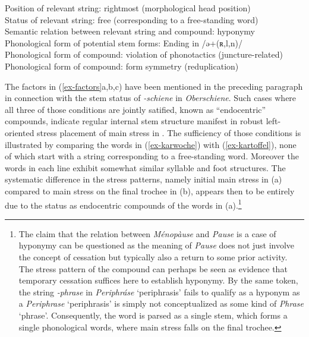 \documentclass[output=paper
 ,nobabel
 ,draftmode
 ,colorlinks, citecolor=brown
]{langscibook}
\begin{document}
\eal\label{ex-factors}

\ex\label{ex-rightmost} 
Position of relevant string: rightmost (morphological head position)\\
     
\ex\label{ex-hyponymy}
Status of relevant string: free (corresponding to a free-standing word)\\
  
\ex\label{ex-free-bound}  
Semantic relation between relevant string and compound: hyponymy\\

\ex\label{ex-stem-end}
Phonological form of potential stem forms: Ending in /ə+({ʀ,l,n})/ \\

\ex\label{ex-phon-viol}
Phonological form of compound: violation of phonotactics (juncture-related) \\
 
\ex\label{ex-phon-rep}
Phonological form of compound: form symmetry (reduplication) \\
    
\zl

\noindent
The factors in (\ref{ex-factors}a,b,c) have been
mentioned in the preceding paragraph in connection with the stem status of \emph{-schiene} in {\it
  Oberschiene}. Such cases where all three of those conditions are jointly satified, known as
``endocentric'' compounds, indicate regular internal stem structure manifest in robust left\hyp
oriented stress placement of main stress in . The sufficiency of
those conditions is illustrated by comparing the words in (\ref{ex-karwoche}) with
(\ref{ex-kartoffel}), none of which start with a string corresponding to a free-standing
word. Moreover the words in each line exhibit somewhat similar syllable and foot structures. The
systematic difference in the stress patterns, namely initial main stress in (a) compared to
main stress on the final trochee in (b), appears then to be entirely due to the status as
endocentric compounds of the words in (a).\footnote{The claim that the relation between
  \emph{Ménopàuse} and \emph{Pause} is a case of hyponymy can be questioned as the meaning of
  \emph{Pause} does not just involve the concept of cessation but typically also a return to some
  prior activity. The stress pattern of the compound can perhaps be seen as evidence that temporary
  cessation suffices here to establish hyponymy. By the same token, the string \emph{-phrase} in
  \emph{Periphráse} `periphrasis' fails to qualify as a hyponym as a \emph{Periphrase} `periphrasis'
  is simply not conceptualized as some kind of \emph{Phrase} `phrase'. Consequently, the word is
  parsed as a single stem, which forms a single phonological words, where main stress falls on the
  final trochee.} 
\end{document}

